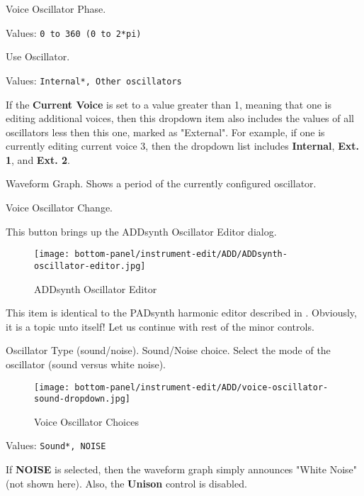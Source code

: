    \setcounter{ItemCounter}{0}      %

   Voice Oscillator Phase.

   Values: \texttt{0 to 360 (0 to 2*pi)}

   Use Oscillator.

   Values: \texttt{Internal*, Other oscillators}

   If the \textbf{Current Voice} is set to a value greater than 1, meaning
   that one is editing additional voices, then this dropdown item also
   includes the values of all oscillators less then this one, marked as
   "External".  For example, if one is currently editing current voice 3,
   then the dropdown list includes \textbf{Internal}, \textbf{Ext. 1}, and
   \textbf{Ext. 2}.

   Waveform Graph.
   Shows a period of the currently configured oscillator.

   Voice Oscillator Change.
   
   This button brings up the ADDsynth Oscillator Editor dialog.

\begin{figure}[H]
   \centering 
   \texttt{[image: bottom-panel/instrument-edit/ADD/ADDsynth-oscillator-editor.jpg]}
   \caption{ADDsynth Oscillator Editor}
   \label{fig:addsynth_oscillator_editor}
\end{figure}

   This item is identical to the PADsynth harmonic editor described in
   .
   Obviously, it is a topic unto itself!
   Let us continue with rest of the minor controls.

   Oscillator Type (sound/noise).
   Sound/Noise choice.
   Select the mode of the oscillator (sound versus white noise).

\begin{figure}[H]
   \centering 
   \texttt{[image: bottom-panel/instrument-edit/ADD/voice-oscillator-sound-dropdown.jpg]}
   \caption{Voice Oscillator Choices}
   \label{fig:voice_oscillator_choices}
\end{figure}

   Values: \texttt{Sound*, NOISE}

   If \textbf{NOISE} is selected, then the waveform graph simply announces
   "White Noise" (not shown here).  Also, the \textbf{Unison} control is
   disabled.

